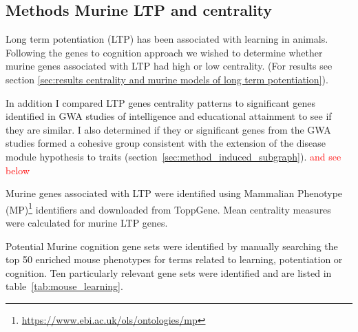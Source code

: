\subsection{Methods Murine LTP and centrality}
\label{sec:methods murine LTP and centrality}
Long term potentiation (LTP) has been associated with learning in animals. Following the genes to cognition approach we wished to determine whether murine genes associated with LTP had high or low centrality. (For results see section \ref{sec:results centrality and murine models of long term potentiation}).

In addition I compared LTP genes centrality patterns to significant genes identified in GWA studies of intelligence and educational attainment to see if they are similar. I also determined if they or significant genes from the GWA studies formed a cohesive group consistent with the extension of the disease module hypothesis to traits (section~\ref{sec:method_induced_subgraph}). \textcolor{red}{and see below}

Murine genes associated with LTP were identified using Mammalian Phenotype (MP)\footnote{\url{https://www.ebi.ac.uk/ols/ontologies/mp}} identifiers\cite{bult2019mouse} and downloaded from ToppGene\cite{chen2009toppgene}. Mean centrality measures were calculated for murine LTP genes.

Potential Murine cognition gene sets were identified by manually searching the top 50 enriched mouse phenotypes for terms related to learning, potentiation or cognition. Ten particularly relevant gene sets were identified and are listed in table~\ref{tab:mouse_learning}.

